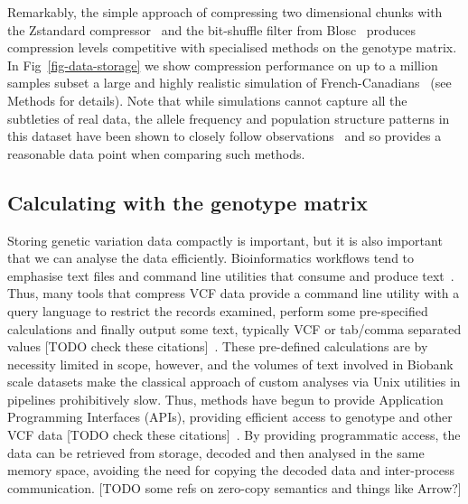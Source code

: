 \documentclass[a4paper,num-refs]{oup-contemporary}
\begin{document}
Remarkably, the simple approach of compressing
two dimensional chunks with the Zstandard 
compressor~\citep{collet2021rfc} and the bit-shuffle
filter from Blosc~\cite{alted2010modern} produces 
compression levels competitive with specialised methods
on the genotype matrix. In Fig~\ref{fig-data-storage}
we show compression performance on up to a million
samples subset a large and highly realistic 
simulation of French-Canadians~\cite{anderson2023on}
(see Methods for details).
Note that while simulations cannot capture 
all the subtleties of real data, the allele frequency
and population structure patterns in this dataset 
have been shown to closely follow 
observations~\cite{anderson2023on} and so provides 
a reasonable data point when comparing such methods.


\subsection{Calculating with the genotype matrix}
Storing genetic variation data compactly is important, but it is also
important that we can analyse the data efficiently. Bioinformatics 
workflows tend to emphasise text files and command line utilities 
that consume and produce text~\citep[e.g.][]{buffalo2015bioinformatics}. 
Thus, many tools that compress VCF data provide a command line 
utility with a query language to restrict the records
examined, perform some pre-specified calculations and finally 
output some text, typically VCF or tab/comma separated values
[TODO check these citations]~\citep{
layer2016efficient, %
li2016bgt, %
tatwawadi2016gtrac, %
danek2018gtc, %
lin2020sparse, %
lan2020genozip,lan2021genozip, %
lefaive2021sparse, %
wertenbroek2022xsi,%
zhang2023gbc}. %
These pre-defined calculations are by necessity limited in scope, however,
and the volumes of text involved in Biobank scale datasets
make the classical approach of custom
analyses via Unix utilities in pipelines prohibitively slow. Thus, 
methods have begun to provide Application Programming Interfaces
(APIs), providing efficient access to genotype and other VCF data
[TODO check these citations]~\cite[e.g.][]{kelleher2013processing,lefaive2021sparse,
wertenbroek2022xsi,zhang2023gbc}. By providing programmatic access,
the data can be retrieved from storage, decoded and then analysed
in the same memory space, avoiding the need for copying
the decoded data and inter-process communication. [TODO some refs
on zero-copy semantics and things like Arrow?]
\end{document}
